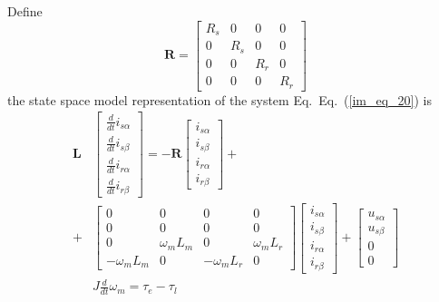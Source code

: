 \documentclass[11pt,a4paper]{scrartcl}
\numberwithin{equation}{section}
\theoremstyle{it}
\theoremstyle{definition}
\renewcommand{\eqref}[1]{Eq.~(\ref{#1})}
\begin{document}
\begin{onehalfspace}
Define 
\begin{equation}\label{im_eq_23}
	\mathbf{R}=
	\left[\begin{matrix}
		R_s & 0 & 0 & 0 \\[6pt]
		0 & R_s & 0 & 0 \\[6pt]
		0 & 0 & R_r & 0 \\[6pt]
		0 & 0 & 0 & R_r 
	\end{matrix}\right]
\end{equation}
the state space model representation of the system Eq.~\eqref{im_eq_20} is
\begin{equation}\label{im_eq_24}
	\begin{aligned}
		\mathbf{L} &
		\begin{bmatrix}
			\frac{d}{dt} i_{s\alpha} \\[6pt]
			\frac{d}{dt} i_{s\beta} \\[6pt]
			\frac{d}{dt} i_{r\alpha} \\[6pt]
			\frac{d}{dt} i_{r\beta}
		\end{bmatrix} = -\mathbf{R}
		\begin{bmatrix}
			i_{s\alpha} \\[6pt]
			i_{s\beta} \\[6pt]
			i_{r\alpha} \\[6pt]
			i_{r\beta} 
		\end{bmatrix} + \\[6pt]
		+ &
		\begin{bmatrix}
			0 & 0 & 0 & 0 \\[6pt]
			0 & 0 & 0 & 0 \\[6pt]
			0 & \omega_mL_m & 0 & \omega_mL_r \\[8pt]
			-\omega_mL_m & 0 & -\omega_mL_r & 0
		\end{bmatrix}
		\begin{bmatrix}
			i_{s\alpha} \\[6pt]
			i_{s\beta} \\[6pt]
			i_{r\alpha} \\[6pt]
			i_{r\beta} 
		\end{bmatrix} + 
		\begin{bmatrix}
			u_{s\alpha} \\[6pt]
			u_{s\beta} \\[6pt]
			0 \\[6pt]
			0
		\end{bmatrix} \\[8pt]
		&
		J\frac{d}{dt}{\omega}_m = \tau_e-\tau_l
	\end{aligned}
\end{equation}

\end{onehalfspace}
\end{document}
